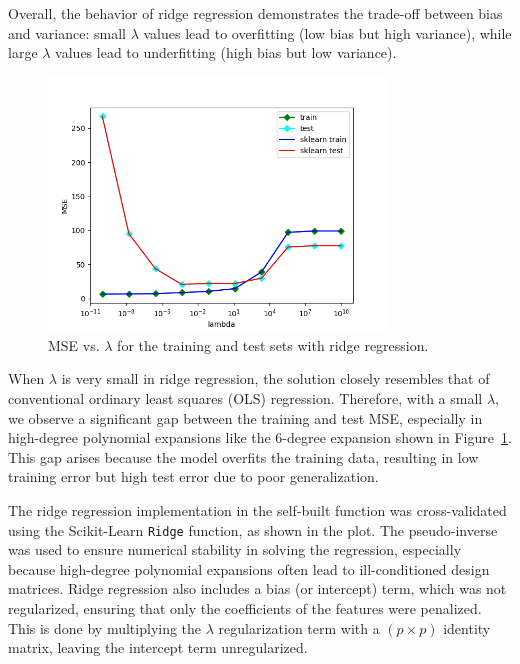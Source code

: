 \documentclass{article}
\begin{document}
Overall, the behavior of ridge regression demonstrates the trade-off between bias and variance: small $\lambda$ values lead to overfitting (low bias but high variance), while large $\lambda$ values lead to underfitting (high bias but low variance).

\begin{figure}[h!]
    \centering
    \includegraphics[width=0.8\textwidth]{sln_figures/fig4_4.png}
    \caption{MSE vs. $\lambda$ for the training and test sets with ridge regression.}
    \label{fig:ridge_plot}
\end{figure}

\FloatBarrier



When $\lambda$ is very small in ridge regression, the solution closely resembles that of conventional ordinary least squares (OLS) regression. Therefore, with a small $\lambda$, we observe a significant gap between the training and test MSE, especially in high-degree polynomial expansions like the 6-degree expansion shown in Figure~\ref{fig:ridge_plot}. This gap arises because the model overfits the training data, resulting in low training error but high test error due to poor generalization.

The ridge regression implementation in the self-built function was cross-validated using the Scikit-Learn \texttt{Ridge} function, as shown in the plot. The pseudo-inverse was used to ensure numerical stability in solving the regression, especially because high-degree polynomial expansions often lead to ill-conditioned design matrices. Ridge regression also includes a bias (or intercept) term, which was not regularized, ensuring that only the coefficients of the features were penalized. This is done by multiplying the $\lambda$ regularization term with a $(p \times p)$ identity matrix, leaving the intercept term unregularized.
\end{document}
